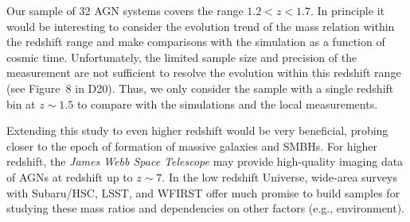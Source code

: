 \documentclass[twocolumn,trackchanges]{aastex63}
\newcommand{\hst}{{\it HST}}
\newcommand{\mbh}{$\mathcal M_{\rm BH}$}
\newcommand{\lhost}{$L_{\rm host}$}
\newcommand{\mstar}{{$M_*$}}
\begin{document}
Our sample of 32 AGN systems covers the range $1.2<z<1.7$. In principle it would be interesting to consider the evolution trend of the mass relation within the redshift range and make comparisons with the simulation as a function of cosmic time. Unfortunately, the limited sample size and precision of the measurement are not sufficient to resolve the evolution within this redshift range (see Figure~8 in D20). Thus, we only consider the sample with a single redshift bin at $z\sim1.5$ to compare with the simulations and the local measurements.

Extending this study to even higher redshift would be very beneficial, probing closer to the epoch of formation of massive galaxies and SMBHs. For higher redshift, the {\it James Webb Space Telescope} may provide high-quality imaging data of AGNs at redshift up to $z\sim7$. In the low redshift Universe, wide-area surveys with Subaru/HSC, LSST, and WFIRST offer much promise to build samples for studying these mass ratios and dependencies on other factors (e.g., environment).




\end{document}
